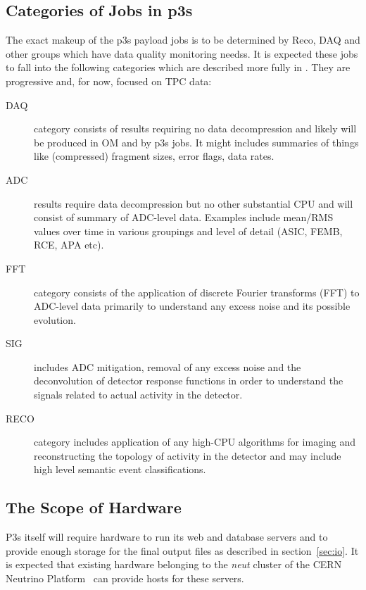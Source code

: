 \documentclass[pdftex,12pt,letter]{article}
\begin{document}
\subsection{Categories of Jobs in p3s}
\label{sec:categories}

The exact makeup of the p3s payload jobs is to be determined by Reco,
DAQ and other groups which have data quality monitoring needss.  It is
expected these jobs to fall into the following categories which are
described more fully in \cite{docdb1811}.  They are progressive and,
for now, focused on TPC data:

\begin{description}

\item[DAQ] category consists of results requiring no data
  decompression and likely will be produced in OM and by p3s jobs.  It
  might includes summaries of things like (compressed) fragment sizes,
  error flags, data rates.

\item[ADC] results require data decompression but no other substantial
  CPU and will consist of summary of ADC-level data.  Examples include
  mean/RMS values over time in various groupings and level of detail
  (ASIC, FEMB, RCE, APA etc).

\item[FFT] category consists of the application of discrete Fourier
  transforms (FFT) to ADC-level data primarily to understand any
  excess noise and its possible evolution.

\item[SIG] includes ADC mitigation, removal of any excess noise and
  the deconvolution of detector response functions in order to
  understand the signals related to actual activity in the detector.

\item[RECO] category includes application of any high-CPU algorithms
  for imaging and reconstructing the topology of activity in the
  detector and may include high level semantic event classifications.

\end{description}

\subsection{The Scope of Hardware}
P3s itself will require hardware to run its web and database servers
and to provide enough storage for the final output files as described in
section~\ref{sec:io}.  It is expected that existing hardware belonging
to the \textit{neut} cluster of the CERN Neutrino Platform~\cite{neut}
can provide hosts for these servers.
\end{document}
